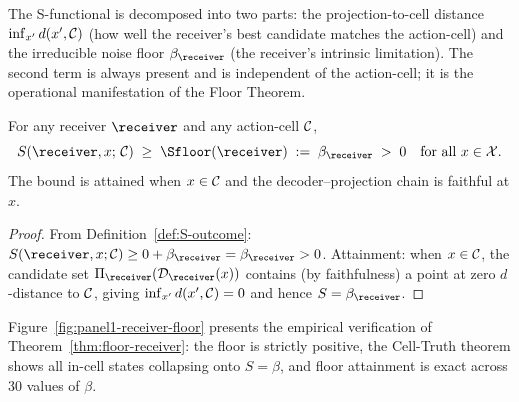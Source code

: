 The S-functional is decomposed into two parts: the projection-to-cell distance $\inf_{x'} d(x', \mathcal{C})$ (how well the receiver's best candidate matches the action-cell) and the irreducible noise floor $\NoiseFloor_\receiver$ (the receiver's intrinsic limitation). The second term is always present and is independent of the action-cell; it is the operational manifestation of the Floor Theorem.

\begin{theorem}\label{thm:floor-receiver}
For any receiver $\receiver$ and any action-cell $\mathcal{C}$,
\[
S(\receiver, x;\, \Cell) \;\geq\; \Sfloor(\receiver) \;:=\; \NoiseFloor_\receiver \;>\; 0 \quad \text{for all } x \in \OutcomeX.
\]
The bound is attained when $x \in \mathcal{C}$ and the decoder--projection chain is faithful at $x$.
\end{theorem}

\begin{proof}
From Definition~\ref{def:S-outcome}: $S(\receiver, x; \Cell) \geq 0 + \NoiseFloor_\receiver = \NoiseFloor_\receiver > 0$. Attainment: when $x \in \mathcal{C}$, the candidate set $\Pi_\receiver(\mathcal{D}_\receiver(x))$ contains (by faithfulness) a point at zero $d$-distance to $\mathcal{C}$, giving $\inf_{x'} d(x', \mathcal{C}) = 0$ and hence $S = \NoiseFloor_\receiver$.
\end{proof}

Figure~\ref{fig:panel1-receiver-floor} presents the empirical verification of Theorem~\ref{thm:floor-receiver}: the floor is strictly positive, the Cell-Truth theorem shows all in-cell states collapsing onto $S = \beta$, and floor attainment is exact across 30 values of $\beta$.

